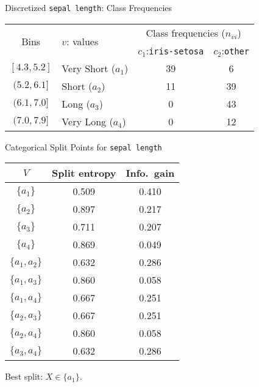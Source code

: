 \begin{frame}{Discretized {\tt sepal length}: Class Frequencies}
\begin{center}
\renewcommand{\arraystretch}{1.1}
\begin{tabular}{|c|l|c|c|}
                \hline
                \multirow{2}{*}{Bins} & \multirow{2}{*}{$v$: values }
                    & \multicolumn{2}{c|}{Class frequencies
                        ($n_{vi}$)}\\
                    \cline{3-4}
                & & $c_1$:{\tt iris-setosa} & $c_2$:{\tt other}\\
                \hline
                $[4.3, 5.2]$ & Very Short ($a_1$) & 39 & 6\\
                $(5.2, 6.1]$ & Short ($a_2$) & 11 & 39\\
                $(6.1, 7.0]$ & Long ($a_3$) & 0 & 43\\
                $(7.0, 7.9]$ & Very Long ($a_4$) & 0 & 12\\
                \hline
\end{tabular}%
\end{center}
\end{frame}


\begin{frame}{Categorical Split Points for {\tt sepal length}}
\begin{center}
\renewcommand{\arraystretch}{1.1}
\begin{tabular}{|c|c|c|}
    \hline
    $V$ & Split entropy & Info.\ gain\\
    \hline
    $\{ a_1 \}$ & 0.509 & 0.410\\
    $\{ a_2 \}$ & 0.897 & 0.217\\
    $\{ a_3 \}$ & 0.711 & 0.207\\
    $\{ a_4 \}$ & 0.869 & 0.049\\
    $\{ a_1, a_2\}$ & 0.632 & 0.286\\
    $\{ a_1, a_3\}$ & 0.860 & 0.058\\
    $\{ a_1, a_4\}$ & 0.667 & 0.251\\
    $\{ a_2, a_3\}$ & 0.667 & 0.251\\
    $\{ a_2, a_4\}$ & 0.860 & 0.058\\
    $\{ a_3, a_4\}$ & 0.632 & 0.286\\
    \hline
    \end{tabular}%
\end{center}
Best split: $X \in \{a_1\}$.
\end{frame}
